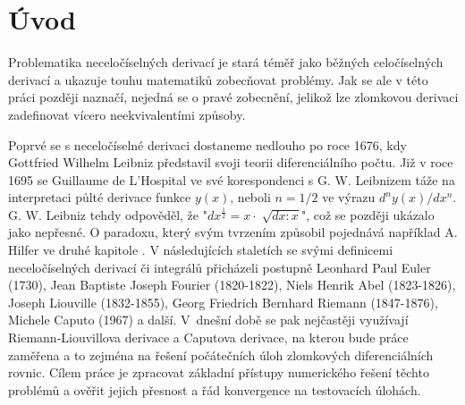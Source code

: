 \documentclass[a4paper,12pt,twoside]{article}
\theoremstyle{definition}
\theoremstyle{remark}
\numberwithin{equation}{section}
\numberwithin{table}{section}
\numberwithin{figure}{section}
\begin{document}
\newpage
\pagestyle{fancy}
\setlength{\headheight}{13.78807pt}
\renewcommand{\headrulewidth}{0.4pt}
\renewcommand{\sectionmark}[1]{\markboth{\thesection~  #1}{} }
\fancyhead[LO,RE]{\small\textit{\nouppercase{\leftmark}}}
\fancyhead[LE,RO]{\small\thepage}
\fancyfoot[LE,RO]{\empty}
\fancyfoot[CE,CO]{\empty}


\newpage
\tableofcontents
\newpage


\section{Úvod}

Problematika neceločíselných derivací je stará téměř jako běžných celočíselných derivací a ukazuje touhu matematiků zobecňovat problémy. Jak se ale v této práci později naznačí, nejedná se o pravé zobecnění, jelikož lze zlomkovou derivaci zadefinovat vícero neekvivalentími způsoby. 

Poprvé se s neceločíselné derivaci dostaneme nedlouho po roce 1676, kdy Gottfried Wilhelm Leibniz představil svoji teorii diferenciálního počtu. Již v roce 1695 se Guillaume de L'Hospital ve své korespondenci s G. W. Leibnizem táže na interpretaci půlté derivace funkce $y\left(x\right)$, neboli  $n = 1/2$ ve výrazu ${d^{n}y\left(x\right)}/{dx^{n}}$. G. W. Leibniz tehdy odpověděl, že "$dx^{\frac{1}{2}} = x \cdot \sqrt[]{dx :x}$", což se později ukázalo jako nepřesné. O paradoxu, který svým tvrzením způsobil pojednává například A. Hilfer ve druhé kapitole \cite{LeibnitzFail}. %
V následujících staletích se svými definicemi neceločíselných derivací či integrálů přicházeli postupně Leonhard Paul Euler (1730), Jean Baptiste Joseph Fourier (1820-1822), Niels Henrik Abel (1823-1826), Joseph Liouville (1832-1855), Georg Friedrich Bernhard Riemann  (1847-1876), Michele Caputo (1967)  a další. 
V~dnešní době se pak nejčastěji využívají Riemann-Liouvillova derivace a Caputova derivace, na kterou bude práce zaměřena a to zejména na řešení počátečních úloh zlomkových diferenciálních rovnic. Cílem práce je zpracovat základní přístupy numerického řešení těchto problémů a ověřit jejich přesnost a řád konvergence na testovacích úlohách.
\end{document}
